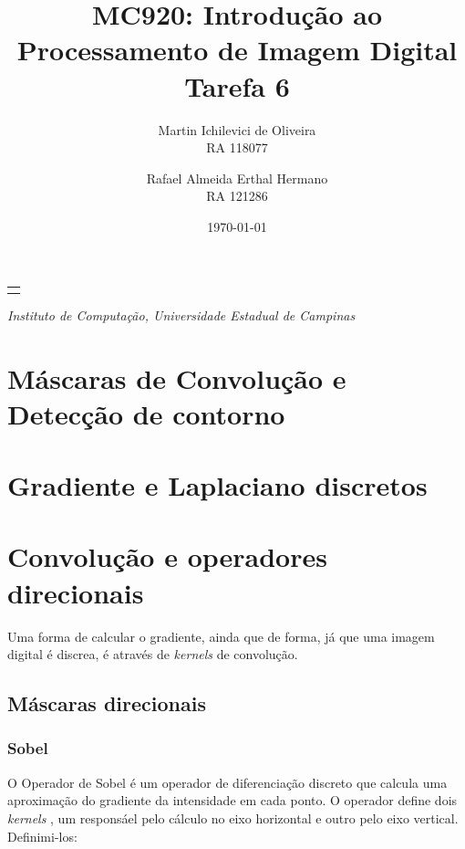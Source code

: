 \documentclass[10pt,a4paper]{article}
\makeatletter
\let\@institution\empty
\def\institution#1{\def\@institution{#1}}
\renewcommand{\maketitle}{
    \begin{center}
        {\Large\bfseries\@title\par\medskip}
        {\large
            \begin{tabular}[t]{c}%
                \@author
        \end{tabular}\par\medskip}
        {\itshape\@institution\par}
        {\itshape\@date\par}
\end{center}}
\newcommand{\kernels}{\textit{kernels} }
\makeatother
\begin{document}

\title{MC920: Introdução ao Processamento de Imagem Digital\\Tarefa 6}
\author{
    \begin{minipage}{6cm}
        \centering
        Martin Ichilevici de Oliveira\\
        RA 118077
    \end{minipage}
    \and
    \begin{minipage}{6cm}
        \centering
        Rafael Almeida Erthal Hermano\\
        RA 121286
    \end{minipage}
}
\institution{Instituto de Computação, Universidade Estadual de Campinas}
\date{\today}

\maketitle


\section{Máscaras de Convolução e Detecção de contorno}
\section{Gradiente e Laplaciano discretos}
\section{Convolução e operadores direcionais}
Uma forma de calcular o gradiente, ainda que de forma, já que uma imagem digital é discrea, é através de \kernels de convolução.
\subsection{Máscaras direcionais}
\subsubsection{Sobel}
O Operador de Sobel é um operador de diferenciação discreto que calcula uma aproximação do gradiente da intensidade em cada ponto. O operador define dois \kernels, um responsáel pelo cálculo no eixo horizontal e outro pelo eixo vertical. Definimi-los:
\end{document}
